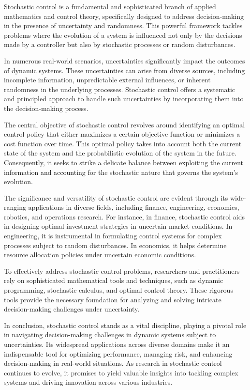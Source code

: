 \documentclass[11pt,twoside]{article}
\numberwithin{Theorem}{section}
\numberwithin{Definition}{section}
\numberwithin{Lemma}{section}
\numberwithin{Algorithm}{section}
\numberwithin{equation}{section}
\begin{document}
Stochastic control is a fundamental and sophisticated branch of applied mathematics and control theory, specifically designed to address decision-making in the presence of uncertainty and randomness. This powerful framework tackles problems where the evolution of a system is influenced not only by the decisions made by a controller but also by stochastic processes or random disturbances.

In numerous real-world scenarios, uncertainties significantly impact the outcomes of dynamic systems. These uncertainties can arise from diverse sources, including incomplete information, unpredictable external influences, or inherent randomness in the underlying processes. Stochastic control offers a systematic and principled approach to handle such uncertainties by incorporating them into the decision-making process.

The central objective of stochastic control revolves around identifying an optimal control policy that either maximizes a certain objective function or minimizes a cost function over time. This optimal policy takes into account both the current state of the system and the probabilistic evolution of the system in the future. Consequently, it seeks to strike a delicate balance between exploiting the current information and accounting for the stochastic nature that governs the system's evolution.

The significance and versatility of stochastic control are evident through its wide-ranging applications in diverse fields, including finance, engineering, economics, robotics, and operations research. For instance, in finance, stochastic control aids in designing optimal investment strategies in uncertain market conditions. In engineering, it is instrumental in formulating control systems for complex processes subject to random disturbances. In economics, it helps determine resource allocation policies under uncertain economic conditions.

To effectively address stochastic control problems, researchers and practitioners rely on sophisticated mathematical tools and techniques, such as dynamic programming, stochastic calculus, and optimal control theory. These rigorous tools provide the necessary foundation for analyzing and solving intricate decision-making challenges under uncertainty.

In conclusion, stochastic control stands as a vital discipline, playing a pivotal role in navigating decision-making challenges in dynamic systems subject to uncertainties. Its widespread applications across diverse domains make it an indispensable tool for optimizing performance, managing risk, and enhancing decision-making in real-world situations. As research in stochastic control continues to evolve, it promises to yield valuable insights into tackling complex systems and driving innovation across various industries.\cite{SC}
\end{document}
